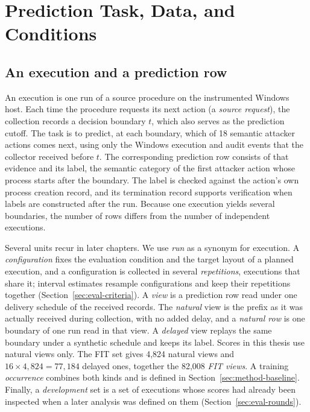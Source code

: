 \chapter{Prediction Task, Data, and Conditions}
\label{ch:task}

\section{An execution and a prediction row}
\label{sec:task-rows}

An execution is one run of a source procedure on the instrumented
Windows host. Each time the procedure requests its next action (a
\emph{source request}), the collection records a decision boundary
$t$, which also serves as the prediction cutoff. The task is to predict,
at each boundary, which of 18 semantic attacker actions comes next,
using only the Windows execution and audit events that the collector
received before $t$. The corresponding prediction row consists of that
evidence and its label, the semantic category of the first attacker
action whose process starts after the boundary. The label is checked against the
action's own process creation record, and its termination record
supports verification when labels are constructed after the run.
Because one execution yields several boundaries, the number of rows
differs from the number of independent executions.

Several units recur in later chapters. We use \emph{run} as a synonym
for execution. A \emph{configuration} fixes the evaluation condition
and the target layout of a planned execution, and a configuration is
collected in several \emph{repetitions}, executions that share it;
interval estimates resample configurations and keep their repetitions
together (Section~\ref{sec:eval-criteria}). A \emph{view} is a
prediction row read under one delivery schedule of the received
records. The \emph{natural} view is the prefix as it was actually
received during collection, with no added delay, and a \emph{natural
row} is one boundary of one run read in that view. A \emph{delayed} view
replays the same boundary under a synthetic schedule and keeps its
label. Scores in this thesis use natural views only. The FIT set gives
4,824 natural views and $16\times4{,}824=77{,}184$ delayed ones,
together the 82,008 \emph{FIT views}. A training \emph{occurrence}
combines both kinds and is defined in Section~\ref{sec:method-baseline}.
Finally, a \emph{development} set is a set of executions whose scores
had already been inspected when a later analysis was defined on them
(Section~\ref{sec:eval-rounds}).

